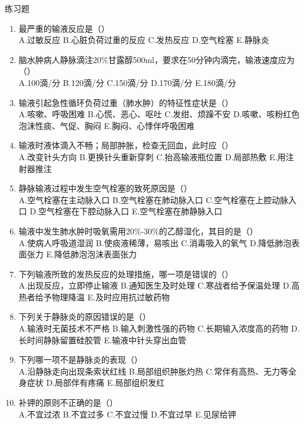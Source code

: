 \documentclass[11pt, a4paper]{ctexart}
\begin{document}
\begin{examplebox}{练习题}
	\begin{enumerate}
		\item 最严重的输液反应是（\qquad）\\
		      A.过敏反应 \quad B.心脏负荷过重的反应 \quad C.发热反应 \quad D.空气栓塞 \quad E.静脉炎
		\item 脑水肿病人静脉滴注20\%甘露醇500ml，要求在50分钟内滴完，输液速度应为（\qquad）\\
		      A.100滴/分 \quad B.120滴/分 \quad C.150滴/分 \quad D.170滴/分 \quad E.180滴/分
		\item 输液引起急性循环负荷过重（肺水肿）的特征性症状是（\qquad）\\
		      A.咳嗽、呼吸困难 \quad B.心慌、恶心、呕吐 \quad C.发绀、烦躁不安 \quad D.咳嗽、咳粉红色泡沫性痰、气促、胸闷 \quad E.胸闷、心悸伴呼吸困难
		\item 输液时液体滴入不畅；局部肿胀，检查无回血，此时应（\qquad）\\
		      A.改变针头方向 \quad B.更换针头重新穿刺 \quad C.抬高输液瓶位置 \quad D.局部热敷 \quad E.用注射器推注
		\item 静脉输液过程中发生空气栓塞的致死原因是（\qquad）\\
		      A.空气栓塞在主动脉入口 \quad B.空气栓塞在肺动脉入口 \quad C.空气栓塞在上腔动脉入口 \quad D.空气栓塞在下腔动脉入口 \quad E.空气栓塞在肺静脉入口
		\item 输液中发生肺水肿时吸氧需用20\%-30\%的乙醇湿化，其目的是（\qquad）\\
		      A.使病人呼吸道湿润 \quad B.使痰液稀薄，易咳出 \quad C.消毒吸入的氧气 \quad D.降低肺泡表面张力 \quad E.降低肺泡泡沫表面张力
		\item 下列输液所致的发热反应的处理措施，哪一项是错误的（\qquad）\\
		      A.出现反应，立即停止输液 \quad B.通知医生及时处理 \quad C.寒战者给予保温处理 \quad D.高热者给予物理降温 \quad E.及时应用抗过敏药物
		\item 下列关于静脉炎的原因错误的是（\qquad）\\
		      A.输液时无菌技术不严格 \quad B.输入刺激性强的药物 \quad C.长期输入浓度高的药物 \quad D.长时间静脉留置硅胶管 \quad E.输液中针头穿出血管
		\item 下列哪一项不是静脉炎的表现（\qquad）\\
		      A.沿静脉走向出现条索状红线 \quad B.局部组织肿胀灼热 \quad C.常伴有高热、无力等全身症状 \quad D.局部伴有疼痛 \quad E.局部组织发红
		\item 补钾的原则不正确的是（\qquad）\\
		      A.不宜过浓 \quad B.不宜过多 \quad C.不宜过慢 \quad D.不宜过早 \quad E.见尿给钾
	\end{enumerate}
\end{examplebox}
\end{document}
